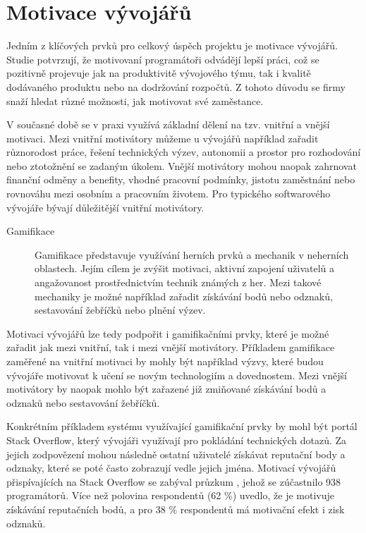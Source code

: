 \section{Motivace vývojářů}

Jedním z klíčových prvků pro celkový úspěch projektu je motivace vývojářů. Studie \cite{developer-motivation, motivation-agile-teams} potvrzují, že motivovaní programátoři odvádějí lepší práci, což se pozitivně projevuje jak na produktivitě vývojového týmu, tak i kvalitě dodávaného produktu nebo na dodržování rozpočtů. Z tohoto důvodu se firmy snaží hledat různé možnosti, jak motivovat své zaměstance.

V současné době se v praxi využívá základní dělení na tzv. vnitřní a vnější motivaci. Mezi vnitřní motivátory můžeme u vývojářů například zařadit různorodost práce, řešení technických výzev, autonomii a prostor pro rozhodování nebo ztotožnění se zadaným úkolem. Vnější motivátory mohou naopak zahrnovat finanční odměny a benefity, vhodné pracovní podmínky, jistotu zaměstnání nebo rovnováhu mezi osobním a pracovním životem. Pro typického softwarového vývojáře bývají důležitější vnitřní motivátory. \cite{developer-motivation, motivation-agile-teams}

\begin{description}
    \item[Gamifikace] Gamifikace představuje využívání herních prvků a mechanik v neherních oblastech. Jejím cílem je zvýšit motivaci, aktivní zapojení uživatelů a angažovanost prostřednictvím technik známých z her. Mezi takové mechaniky je možné například zařadit získávání bodů nebo odznaků, sestavování žebříčků nebo plnění výzev. \cite{gamification}
\end{description}

Motivaci vývojářů lze tedy podpořit i gamifikačními prvky, které je možné zařadit jak mezi vnitřní, tak i mezi vnější motivátory. Příkladem gamifikace zaměřené na vnitřní motivaci by mohly být například výzvy, které budou vývojáře motivovat k učení se novým technologiím a dovednostem. Mezi vnější motivátory by naopak mohlo být zařazené již zmiňované získávání bodů a odznaků nebo sestavování žebříčků.

Konkrétním příkladem systému využívající gamifikační prvky by mohl být portál Stack Overflow, který vývojáři využívají pro pokládání technických dotazů. Za jejich zodpovězení mohou následně ostatní uživatelé získávat reputační body a odznaky, které se poté často zobrazují vedle jejich jména. Motivací vývojářů přispívajících na Stack Overflow se zabýval průzkum \cite{gamification-so}, jehož se zúčastnilo 938 programátorů. Více než polovina respondentů (62 \%) uvedlo, že je motivuje získávání reputačních bodů, a pro 38 \% respondentů má motivační efekt i zisk odznaků.

